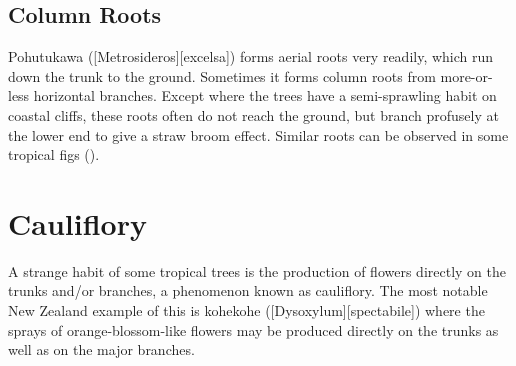\subsection{Column Roots}

Pohutukawa ([Metrosideros][excelsa]) forms aerial roots very readily, which run down the trunk to the ground.
Sometimes it forms column roots from more-or-less horizontal branches.
Except where the trees have a semi-sprawling habit on coastal cliffs, these roots often do not reach the ground, but branch profusely at the lower end to give a straw broom effect.
Similar roots can be observed in some tropical figs ().

\section{Cauliflory}

A strange habit of some tropical trees is the production of flowers directly on the trunks and/or branches, a phenomenon known as cauliflory.
The most notable New Zealand example of this is kohekohe ([Dysoxylum][spectabile]) where the sprays of orange-blossom-like flowers may be produced directly on the trunks as well as on the major branches.


